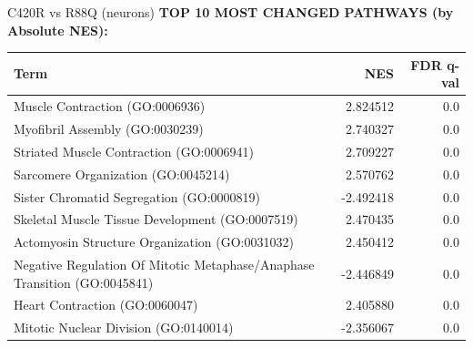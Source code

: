 \documentclass[10pt, aspectratio=169]{beamer}
\begin{document}
\begin{frame}{C420R vs R88Q (neurons)}
  \centering
  {\small \textbf{TOP 10 MOST CHANGED PATHWAYS (by Absolute NES):}}\par
  \vspace{0.15cm}
  \scriptsize
  \begin{tabular}{p{8cm} r r}
    \toprule
    \textbf{Term} & \textbf{NES} & \textbf{FDR q-val} \\
    \midrule
    Muscle Contraction (GO:0006936) & 2.824512 & 0.0 \\
    Myofibril Assembly (GO:0030239) & 2.740327 & 0.0 \\
    Striated Muscle Contraction (GO:0006941) & 2.709227 & 0.0 \\
    Sarcomere Organization (GO:0045214) & 2.570762 & 0.0 \\
    Sister Chromatid Segregation (GO:0000819) & -2.492418 & 0.0 \\
    Skeletal Muscle Tissue Development (GO:0007519) & 2.470435 & 0.0 \\
    Actomyosin Structure Organization (GO:0031032) & 2.450412 & 0.0 \\
    Negative Regulation Of Mitotic Metaphase/Anaphase Transition (GO:0045841) & -2.446849 & 0.0 \\
    Heart Contraction (GO:0060047) & 2.405880 & 0.0 \\
    Mitotic Nuclear Division (GO:0140014) & -2.356067 & 0.0 \\
    \bottomrule
  \end{tabular}
\end{frame}
\end{document}
